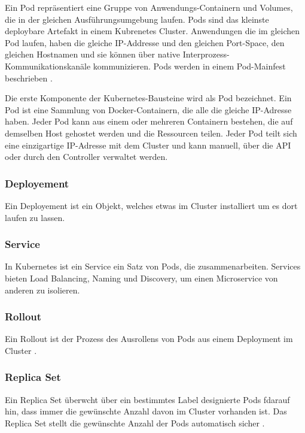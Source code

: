 {Ein Pod repräsentiert eine Gruppe von Anwendungs-Containern und Volumes, die in der gleichen Ausführungsumgebung laufen. Pods sind das kleinste deploybare Artefakt in einem Kubrenetes Cluster. Anwendungen die im gleichen Pod laufen, haben die gleiche IP-Addresse und den gleichen Port-Space, den gleichen Hostnamen und sie können über native Interprozess-Kommunikationskanäle kommunizieren. Pods werden in einem Pod-Mainfest beschrieben \cite[S.48,49]{burns1}.

Die erste Komponente der Kubernetes-Bausteine wird als Pod bezeichnet. Ein Pod ist eine Sammlung von Docker-Containern, die alle die gleiche IP-Adresse haben. Jeder Pod kann aus einem oder mehreren Containern bestehen, die auf demselben Host gehostet werden und die Ressourcen teilen. Jeder Pod teilt sich eine einzigartige IP-Adresse mit dem Cluster und kann manuell, über die API oder durch den Controller verwaltet werden. \cite[S.80-81]{riti}

\subsubsection{Deployement}

Ein Deployement ist ein Objekt, welches etwas im Cluster installiert um es dort laufen zu lassen. \cite[S. 166-192]{stender}

\subsubsection{Service}

In Kubernetes ist ein Service ein Satz von Pods, die zusammenarbeiten. \cite[S.80-81]{riti}
Services bieten Load Balancing, Naming und Discovery, um einen Microservice von anderen zu isolieren.  \cite[S.8]{burns1}

\subsubsection{Rollout}

Ein Rollout ist der Prozess des Ausrollens von Pods aus einem Deployment im Cluster \cite[S.180]{stender}.

\subsubsection{Replica Set}

Ein Replica Set überwcht über ein bestimmtes Label designierte Pods fdarauf hin, dass immer die gewünschte Anzahl davon im Cluster vorhanden ist. Das Replica Set stellt die gewünschte Anzahl der Pods automatisch sicher \cite[S.179]{stender}.

}
